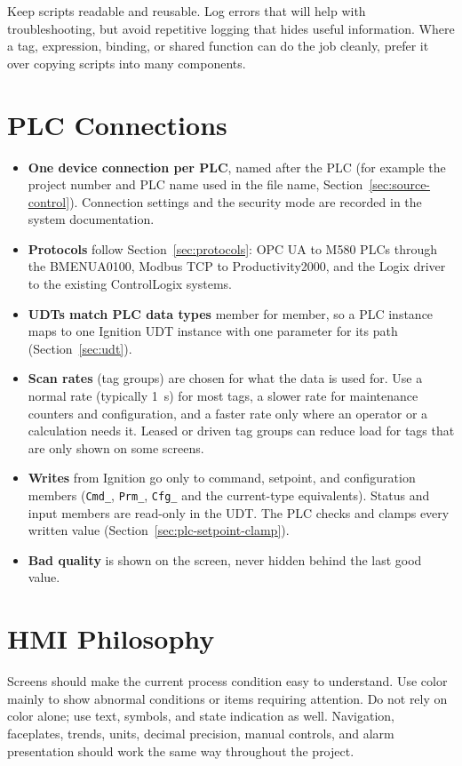 Keep scripts readable and reusable. Log errors that will help with troubleshooting, but avoid repetitive logging that hides useful information. Where a tag, expression, binding, or shared function can do the job cleanly, prefer it over copying scripts into many components.

\section[PLC Connections]{PLC Connections \newmark}\label{sec:ignition-plc-connections}
\begin{itemize}[itemsep=1pt]
  \item \textbf{One device connection per PLC}, named after the PLC (for example the project number and PLC name used in the file name, Section~\ref{sec:source-control}). Connection settings and the security mode are recorded in the system documentation.
  \item \textbf{Protocols} follow Section~\ref{sec:protocols}: OPC UA to M580 PLCs through the BMENUA0100, Modbus TCP to Productivity2000, and the Logix driver to the existing ControlLogix systems.
  \item \textbf{UDTs match PLC data types} member for member, so a PLC instance maps to one Ignition UDT instance with one parameter for its path (Section~\ref{sec:udt}).
  \item \textbf{Scan rates} (tag groups) are chosen for what the data is used for. Use a normal rate (typically 1~s) for most tags, a slower rate for maintenance counters and configuration, and a faster rate only where an operator or a calculation needs it. Leased or driven tag groups can reduce load for tags that are only shown on some screens.
  \item \textbf{Writes} from Ignition go only to command, setpoint, and configuration members (\texttt{Cmd\_}, \texttt{Prm\_}, \texttt{Cfg\_} and the current-type equivalents). Status and input members are read-only in the UDT. The PLC checks and clamps every written value (Section~\ref{sec:plc-setpoint-clamp}).
  \item \textbf{Bad quality} is shown on the screen, never hidden behind the last good value.
\end{itemize}

\section{HMI Philosophy}
Screens should make the current process condition easy to understand. Use color mainly to show abnormal conditions or items requiring attention. Do not rely on color alone; use text, symbols, and state indication as well. Navigation, faceplates, trends, units, decimal precision, manual controls, and alarm presentation should work the same way throughout the project.

